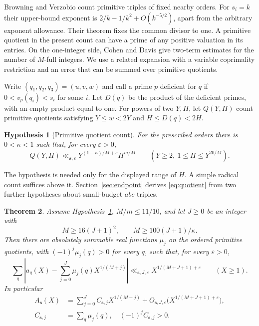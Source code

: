 \documentclass[11pt,reqno]{amsart}
\newtheorem{theorem}{Theorem}[section]
\newtheorem{hypothesis}[theorem]{Hypothesis}
\newcommand{\eps}{\varepsilon}
\newcommand{\sord}{\boldsymbol{s}}
\begin{document}
Browning and Verzobio \cite[Theorem~1.1]{BV} count primitive triples of
fixed nearby orders. For \(s_i=k\) their upper-bound exponent is
\(2/k-1/k^2+O(k^{-5/2})\), apart from the arbitrary exponent allowance.
Their theorem fixes the common divisor to one. A primitive quotient in the
present count can have a prime of any positive valuation in its entries.
On the one-integer side, Cohen and Davis \cite[\S\S6--7]{CD} give two-term
estimates for the number of \(M\)-full integers. We use a related expansion
with a variable coprimality restriction and an error that can be summed
over primitive quotients.

Write \((q_1,q_2,q_3)=(u,v,w)\) and call a prime \(p\) deficient for
\(q\) if \(0<v_p(q_i)<s_i\) for some \(i\). Let \(D(q)\) be the product
of the deficient primes, with an empty product equal to one. For powers
of two \(Y,H\), let \(Q(Y,H)\) count primitive quotients satisfying
\(Y\le w<2Y\) and \(H\le D(q)<2H\).

\begin{hypothesis}[Primitive quotient count]\label{hyp:quotient}
For the prescribed orders there is \(0<\kappa<1\) such that, for every
\(\eps>0\),
\begin{equation}\label{eq:quotient}
  Q(Y,H)\ll_{\sord,\eps}Y^{(1-\kappa)/M+\eps}H^{m/M}
   \qquad (Y\ge2,\ 1\le H\le Y^{20/M}).
\end{equation}
\end{hypothesis}

The hypothesis is needed only for the displayed range of \(H\). A simple
radical count suffices above it. Section~\ref{sec:endpoint} derives
\eqref{eq:quotient} from two further hypotheses about small-budget
\(abc\) triples.

\begin{theorem}\label{thm:main}
Assume Hypothesis~\ref{hyp:quotient}, \(M/m\le 11/10\), and let \(J\ge0\) be
an integer with
\begin{equation}\label{eq:range}
  M\ge 16(J+1)^2,\qquad M\ge 100(J+1)/\kappa.
\end{equation}
Then there are absolutely summable real functions \(\mu_j\) on the ordered
primitive quotients, with \((-1)^j\mu_j(q)>0\) for every \(q\), such that,
for every \(\eps>0\),
\begin{equation}\label{eq:main}
  \sum_q\left|a_q(X)-\sum_{j=0}^{J}\mu_j(q) X^{1/(M+j)}\right|
   \ll_{\sord,J,\eps} X^{1/(M+J+1)+\eps}\qquad (X\ge 1).
\end{equation}
In particular
\begin{equation}\label{eq:scalar}
\begin{aligned}
  A_{\sord}(X)&=\sum_{j=0}^J C_{\sord,j}X^{1/(M+j)}
       +O_{\sord,J,\eps}\bigl(X^{1/(M+J+1)+\eps}\bigr),\\
  C_{\sord,j}&=\sum_q\mu_j(q),\quad (-1)^jC_{\sord,j}>0.
\end{aligned}
\end{equation}
\end{theorem}
\end{document}
